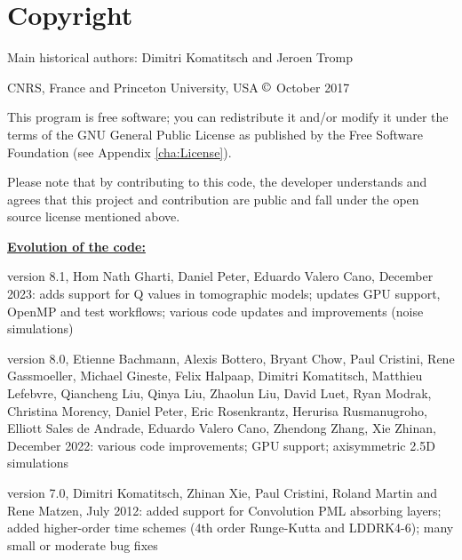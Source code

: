
\chapter*{Copyright}

Main historical authors: Dimitri Komatitsch and Jeroen Tromp

CNRS, France and Princeton University, USA\newline
$\copyright$ October 2017\newline

\noindent
This program is free software; you can redistribute it and/or modify
it under the terms of the GNU General Public License as published
by the Free Software Foundation (see Appendix \ref{cha:License}).\newline

\noindent
Please note that by contributing to this code, the developer understands and agrees that this project and contribution
are public and fall under the open source license mentioned above.\newline

\noindent
\textbf{\underline{Evolution of the code:}}\newline

version 8.1, Hom Nath Gharti, Daniel Peter, Eduardo Valero Cano, December 2023:\newline
adds support for Q values in tomographic models;
updates GPU support, OpenMP and test workflows;
various code updates and improvements (noise simulations)\newline

version 8.0, Etienne Bachmann, Alexis Bottero, Bryant Chow, Paul Cristini, Rene Gassmoeller, Michael Gineste,
Felix Halpaap, Dimitri Komatitsch, Matthieu Lefebvre, Qiancheng Liu, Qinya Liu, Zhaolun Liu,
David Luet, Ryan Modrak, Christina Morency, Daniel Peter, Eric Rosenkrantz, Herurisa Rusmanugroho,
Elliott Sales de Andrade, Eduardo Valero Cano, Zhendong Zhang, Xie Zhinan, December 2022:\newline
various code improvements;
GPU support;
axisymmetric 2.5D simulations\newline

version 7.0, Dimitri Komatitsch, Zhinan Xie, Paul Cristini, Roland Martin and Rene Matzen, July 2012:\newline
added support for Convolution PML absorbing layers;
added higher-order time schemes (4th order Runge-Kutta and LDDRK4-6);
many small or moderate bug fixes\newline

